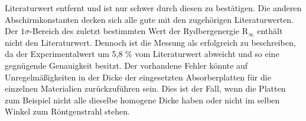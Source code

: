 \documentclass[titlepage = firstcover]{scrartcl}
\begin{document}
            Literaturwert entfernt und ist nur schwer durch diesen zu bestätigen. Die anderen Abschirmkonstanten decken sich alle gute mit den zugehörigen Literaturwerten. Der $1\sigma$-Bereich 
            des zuletzt bestimmten Wert der Rydbergenergie $\text{R}_{\infty}$ enthält nicht den Literaturwert. Dennoch ist die Messung als erfolgreich zu beschreiben, da der Experimentalwert um
            5,8 \% vom Literaturwert abweicht und so eine gegnügende Genauigkeit besitzt. Der vorhandene Fehler könnte auf Unregelmäßigkeiten in der Dicke der eingesetzten Absorberplatten für 
            die einzelnen Materialien zurückzuführen sein. Dies ist der Fall, wenn die Platten zum Beispiel nicht alle dieselbe homogene Dicke haben oder nicht im selben Winkel zum Röntgenstrahl 
            stehen.





          \FloatBarrier
\end{document}
